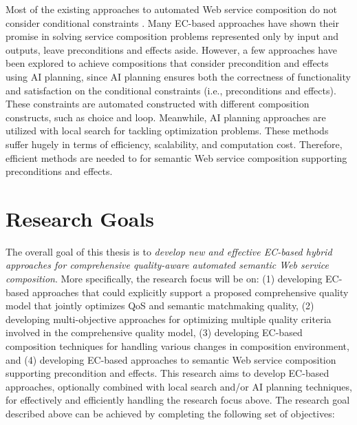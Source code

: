 Most of the existing approaches to automated Web service composition do not consider conditional constraints \cite{paliwal2012semantics}. Many EC-based approaches have shown their promise in solving service composition problems represented only by input and outputs, leave  preconditions and effects aside. However, a few approaches \cite{bansal2016generalized,DBLP:journals/soca/BoustilMS14} have been explored to achieve compositions that consider precondition and effects using AI planning, since AI planning ensures both the correctness of functionality and satisfaction on the conditional constraints (i.e., preconditions and effects). These constraints are automated constructed with different composition constructs, such as choice and loop. Meanwhile, AI planning approaches are utilized with local search for tackling optimization problems. These methods suffer hugely in terms of efficiency, scalability, and computation cost. Therefore, efficient methods are needed to for semantic Web service composition supporting preconditions and effects.


 
\section{Research Goals}
The overall goal of this thesis is to \emph{develop new and effective EC-based hybrid approaches for comprehensive quality-aware automated semantic Web service composition}. More specifically, the research focus will be on: (1) developing EC-based approaches that could explicitly support a proposed comprehensive quality model that jointly optimizes QoS and semantic matchmaking quality, (2) developing multi-objective approaches for optimizing multiple quality criteria involved in the comprehensive quality model, (3) developing EC-based composition techniques for handling various changes in composition environment, and  (4) developing EC-based approaches to semantic Web service composition supporting precondition and effects. This research aims to develop EC-based approaches, optionally combined with local search and/or AI planning techniques, for effectively and efficiently handling the research focus above. The research goal described above can be achieved by completing the following set of objectives:


